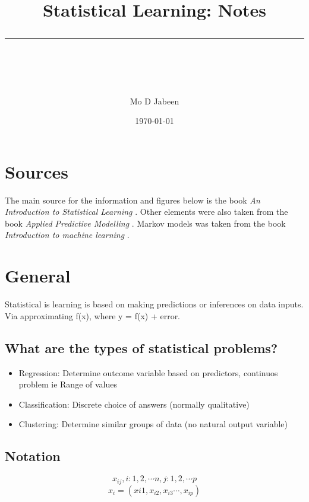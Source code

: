 \documentclass[11pt]{scrartcl} %
\title{	
	\normalfont\normalsize
	\vspace{20pt} %
	{\huge Statistical Learning: Notes}\\ %
	\vspace{12pt} %
	\rule{\linewidth}{2pt}\\ %
}
\author{\small Mo D Jabeen} %
\date{\normalsize\today} %
\begin{document}
\maketitle %

\tableofcontents

\newpage

\section{Sources}

The main source for the information and figures below is the book \textit{An Introduction to Statistical Learning} \cite{james2013introduction}.
Other elements were also taken from the book \textit{Applied Predictive Modelling} \cite{noauthororeditor2013applied}.
Markov models was taken from the book \textit{Introduction to machine learning} \cite{Alpaydin14}.

\section{General}

Statistical is learning is based on making predictions or inferences on data inputs. Via approximating f(x),
where y = f(x) + error.

\subsection{What are the types of statistical problems?}

\begin{itemize}
	\item Regression: Determine outcome variable based on predictors, continuos problem ie Range of values 
	\item Classification: Discrete choice of answers (normally qualitative)
	\item Clustering: Determine similar groups of data (no natural output variable)
\end{itemize}

\subsection{Notation}

\begin{equation}
	x_{ij}, i:1,2,\cdots n, j:1,2,\cdots p
\end{equation}
\begin{equation}
	x_{i} = (x{i1},x_{i2},x_{i3} \cdots,x_{ip})
\end{equation}
\end{document}
